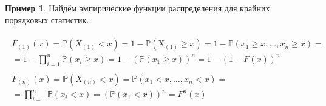 \documentclass[oneside,final,14pt]{extreport}
\theoremstyle{plain}
\theoremstyle{definition}
\newtheorem*{exmp}{Пример}
\theoremstyle{named}
\begin{document}
\begin{exmp}
Найдём эмпирические функции распределения для крайних порядковых статистик.

\begin{gather*}
    \begin{aligned}
        F_{(1)}(x)=\mathbb{P}(X_{(1)} < x) 
    = 1 - \mathbb{P} (\mathrm{X}_{(1)} \geqslant x) 
    = 1 - \mathbb{P}(x_{1} \geqslant x, \ldots, x_{n} \geqslant x) = \\
    = 1 - \prod_{i=1}^{n} \mathbb{P}(x_{i} \geqslant x) 
    = 1 - (\mathbb{P}({x}_{1} \geqslant x))^{n} 
    = 1 - (1 - F(x))^{n} 
    \end{aligned} \\
    \begin{aligned}
        F_{(n)}(x) 
        = \mathbb{P}(X_{(n)} < x) 
        = \mathbb{P}(x_{1} < x, \ldots, x_{n} < x) = \\
        = \prod_{i=1}^{n} \mathbb{P}(x_{i} < x) 
        = (\mathbb{P}({x}_{1} < x))^{n} 
        = F^{n}(x)
    \end{aligned}
\end{gather*}
\end{exmp}
\end{document}
